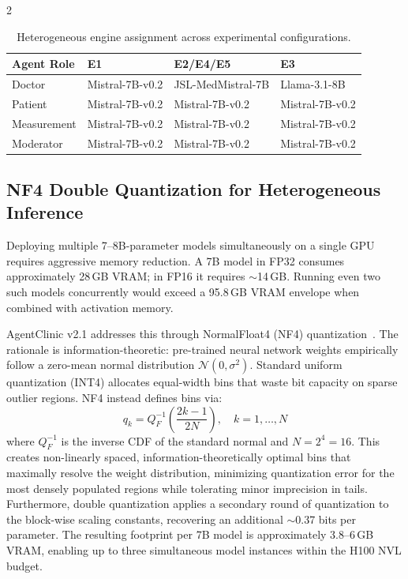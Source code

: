 \documentclass[10pt, a4paper]{article}
\begin{document}
\begin{multicols}{2}
\begin{table}[H]
\centering
\caption{Heterogeneous engine assignment across experimental configurations.}
\label{tab:engine_assignment}
\scriptsize
\begin{tabular}{@{}llll@{}}
\toprule
\textbf{Agent Role} & \textbf{E1} & \textbf{E2/E4/E5} & \textbf{E3} \\
\midrule
Doctor       & Mistral-7B-v0.2        & JSL-MedMistral-7B  & Llama-3.1-8B \\
Patient      & Mistral-7B-v0.2        & Mistral-7B-v0.2    & Mistral-7B-v0.2 \\
Measurement  & Mistral-7B-v0.2        & Mistral-7B-v0.2    & Mistral-7B-v0.2 \\
Moderator    & Mistral-7B-v0.2        & Mistral-7B-v0.2    & Mistral-7B-v0.2 \\
\bottomrule
\end{tabular}
\end{table}

\subsection{NF4 Double Quantization for Heterogeneous Inference}
\label{ssec:quantization}

Deploying multiple 7–8B-parameter models simultaneously on a single GPU requires aggressive memory reduction. A 7B model in FP32 consumes approximately 28\,GB VRAM; in FP16 it requires $\sim$14\,GB. Running even two such models concurrently would exceed a 95.8\,GB VRAM envelope when combined with activation memory.

AgentClinic v2.1 addresses this through NormalFloat4 (NF4) quantization~\cite{dettmers2023qlora}. The rationale is information-theoretic: pre-trained neural network weights empirically follow a zero-mean normal distribution $\mathcal{N}(0, \sigma^2)$. Standard uniform quantization (INT4) allocates equal-width bins that waste bit capacity on sparse outlier regions. NF4 instead defines bins via:
\begin{equation}
    q_k = Q_F^{-1}\!\left(\frac{2k - 1}{2N}\right), \quad k = 1, \ldots, N
\end{equation}
where $Q_F^{-1}$ is the inverse CDF of the standard normal and $N = 2^4 = 16$. This creates non-linearly spaced, information-theoretically optimal bins that maximally resolve the weight distribution, minimizing quantization error for the most densely populated regions while tolerating minor imprecision in tails. Furthermore, double quantization applies a secondary round of quantization to the block-wise scaling constants, recovering an additional $\sim$0.37 bits per parameter. The resulting footprint per 7B model is approximately 3.8–6\,GB VRAM, enabling up to three simultaneous model instances within the H100 NVL budget.



\end{multicols}
\end{document}
